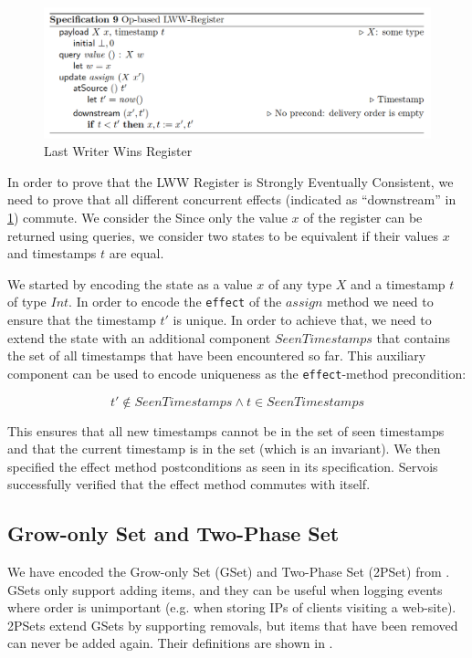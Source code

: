 \documentclass{article}
\begin{document}
\begin{figure}[h]
    \centering
    \includegraphics[width=\textwidth]{lww-definition}
    \caption{Last Writer Wins Register}
    \label{fig:lww-def}
\end{figure}

In order to prove that the LWW Register is Strongly Eventually
Consistent, we need to prove that all different concurrent effects
(indicated as ``downstream'' in \cref{fig:lww-def}) commute. We
consider the Since only the value $x$ of the register can be returned
using queries, we consider two states to be equivalent if their values
$x$ and timestamps $t$ are equal.

We started by encoding the state as a value $x$ of any type $X$ and a
timestamp $t$ of type $Int$. In order to encode the \texttt{effect} of
the $assign$ method we need to ensure that the timestamp $t'$ is
unique. In order to achieve that, we need to extend the state with an
additional component $SeenTimestamps$ that contains the set of all
timestamps that have been encountered so far. This auxiliary component
can be used to encode uniqueness as the \texttt{effect}-method
precondition:

\[
t' \not \in SeenTimestamps \wedge t \in SeenTimestamps
\]

\noindent
This ensures that all new timestamps cannot be in the set of seen
timestamps and that the current timestamp is in the set (which is an
invariant). We then specified the effect method postconditions as seen
in its specification. Servois successfully verified that the effect
method commutes with itself.


\subsection{Grow-only Set and Two-Phase Set}

We have encoded the Grow-only Set (GSet) and Two-Phase Set (2PSet)
from \cite{baquero2017pure}. GSets only support adding items, and they
can be useful when logging events where order is unimportant
(e.g. when storing IPs of clients visiting a web-site). 2PSets extend
GSets by supporting removals, but items that have been removed can
never be added again. Their definitions are shown in
.
\end{document}

